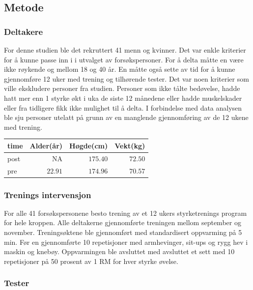 \documentclass[
  letterpaper,
  DIV=11,
  numbers=noendperiod]{scrartcl}
\begin{document}
\hypertarget{metode}{%
\subsection{Metode}\label{metode}}

\hypertarget{deltakere}{%
\subsubsection{Deltakere}\label{deltakere}}

For denne studien ble det rekruttert 41 menn og kvinner. Det var enkle
kriterier for å kunne passe inn i i utvalget av forsøkspersoner. For å
delta måtte en være ikke røykende og mellom 18 og 40 år. En måtte også
sette av tid for å kunne gjennomføre 12 uker med trening og tilhørende
tester. Det var noen kriterier som ville ekskludere personer fra
studien. Personer som ikke tålte bedøvelse, hadde hatt mer enn 1 styrke
økt i uka de siste 12 månedene eller hadde muskelskader eller fra
tidligere fikk ikke mulighet til å delta. I forbindelse med data
analysen ble sju personer utelatt på grunn av en manglende gjennomføring
av de 12 ukene med trening.

\begin{longtable*}{lrrr}
\toprule
time & Alder(år) & Høgde(cm) & Vekt(kg) \\ 
\midrule\addlinespace[2.5pt]
post & NA & $175.40$ & $72.50$ \\ 
pre & $22.91$ & $174.96$ & $70.57$ \\ 
\bottomrule
\end{longtable*}

\hypertarget{trenings-intervensjon}{%
\subsubsection{Trenings intervensjon}\label{trenings-intervensjon}}

For alle 41 forsøkspersonene besto trening av et 12 ukers styrketrenings
program for hele kroppen. Alle deltakerne gjennomførte treningen mellom
september og november. Treningsøktene ble gjennomført med standardisert
oppvarming på 5 min. Før en gjennomførte 10 repetisjoner med
armhevinger, sit-ups og rygg hev i maskin og knebøy. Oppvarmingen ble
avsluttet med avsluttet et sett med 10 repetisjoner på 50 prosent av 1
RM for hver styrke øvelse.

\hypertarget{tester}{%
\subsubsection{Tester}\label{tester}}
\end{document}
